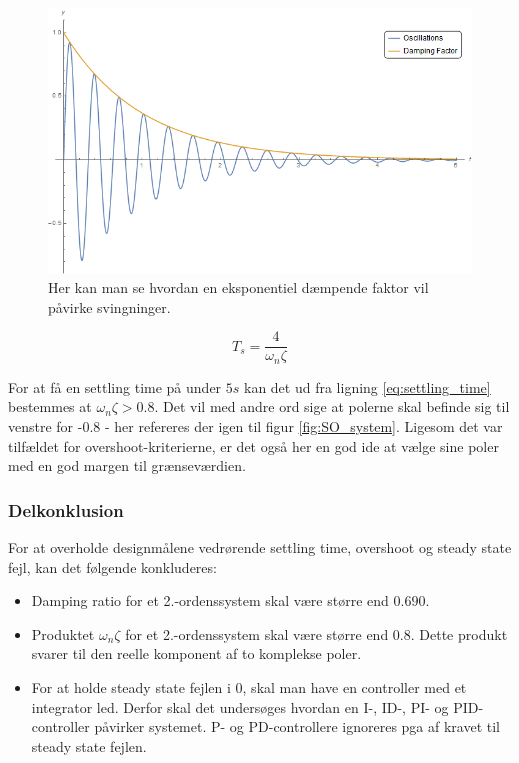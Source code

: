 \begin{figure}[ht]
	\begin{center}
		\includegraphics[scale=0.45]{Billeder/Damped_Oscillations.png}
	\end{center}
\caption{Her kan man se hvordan en eksponentiel dæmpende faktor vil påvirke svingninger.}
\label{fig:Damped_Oscillations}
\end{figure}

\begin{equation}\label{eq:settling_time}
T_{s}=\frac{4}{\omega_{n}\zeta}
\end{equation}

For at få en settling time på under $5s$ kan det ud fra ligning \eqref{eq:settling_time} bestemmes at $\omega_{n}\zeta > 0.8$. Det vil med andre ord sige at polerne skal befinde sig til venstre for -0.8 - her refereres der igen til figur \ref{fig:SO_system}. Ligesom det var tilfældet for overshoot-kriterierne, er det også her en god ide at vælge sine poler med en god margen til grænseværdien.

\subsubsection{Delkonklusion}

For at overholde designmålene vedrørende settling time, overshoot og steady state fejl, kan det følgende konkluderes:

\begin{itemize}
\item Damping ratio for et 2.-ordenssystem skal være større end $0.690$.
\item Produktet $\omega_{n}\zeta$ for et 2.-ordenssystem skal være større end $0.8$. Dette produkt svarer til den reelle komponent af to komplekse poler.
\item For at holde steady state fejlen i 0, skal man have en controller med et integrator led. Derfor skal det undersøges hvordan en I-, ID-, PI- og PID-controller påvirker systemet. P- og PD-controllere ignoreres pga af kravet til steady state fejlen.
\end{itemize}

